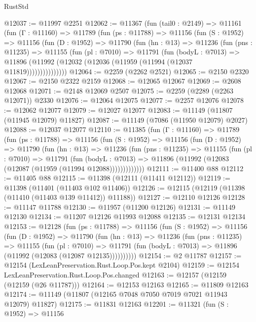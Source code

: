 \begin{lexlean}{RustStd}
\begin{coremodule}
@12037 := @11997 @2251
@12062 := @11367
    (fun (tail0 : @2149) =>
    @11161
      (fun (Γ : @11160) =>
      @11789
        (fun (ps : @11788) =>
        @11156
          (fun (S : @1952) =>
          @11156
            (fun (D : @1952) =>
            @11790
              (fun (hn : @13) =>
              @11236
                (fun (pns : @11235) =>
                @11155
                  (fun (pl : @7010) =>
                  @11791
                    (fun (bodyL : @7013) =>
                    @11896 (@11992 (@12032 (@12036 (@11959 (@11994 (@12037 @11819)))))))))))))))
@12064 := @2259 (@2262 @2521)
@12065 := @2150 @2320
@12067 := @2150 @2322 @2159
@12068 := @12065 @12067
@12069 := @2608 @12068
@12071 := @2148 @12069 @2507
@12075 := @2259 (@2289 (@2263 @12071)) @2330
@12076 := @12064 @12075
@12077 := @2257 @12076
@12078 := @12062 @12077
@12079 := @12027 @12077
@12083 := @11149 (@11807 (@11945 @12079) @11827)
@12087 := @11149 (@7086 (@11950 @12079) @2027)
@12088 := @12037 @12077
@12110 := @11385
    (fun (Γ : @11160) =>
    @11789
      (fun (ps : @11788) =>
      @11156
        (fun (S : @1952) =>
        @11156
          (fun (D : @1952) =>
          @11790
            (fun (hn : @13) =>
            @11236
              (fun (pns : @11235) =>
              @11155
                (fun (pl : @7010) =>
                @11791
                  (fun (bodyL : @7013) =>
                  @11896 (@11992 (@12083 (@12087 (@11959 (@11994 @12088)))))))))))))
@12111 := @11400 @88
@12112 := @11405 @88
@12115 := @11398 (@12111 (@11411 @12112))
@12119 := @11398 (@11401 (@11403 @102 @11406))
@12126 := @12115 (@12119 (@11398 (@11410 (@11403 @139 @11412)) @11188))
@12127 := @12110 @12126
@12128 := @11147 @11788
@12130 := @11957 (@11200 @12126)
@12131 := @11149 @12130
@12134 := @11207 @12126 @11993 @12088
@12135 := @12131 @12134
@12153 := @12128
    (fun (ps : @11788) =>
    @11156
      (fun (S : @1952) =>
      @11156
        (fun (D : @1952) =>
        @11790
          (fun (hn : @13) =>
          @11236
            (fun (pns : @11235) =>
            @11155
              (fun (pl : @7010) =>
              @11791 (fun (bodyL : @7013) => @11896 (@11992 (@12083 (@12087 @12135))))))))))
@12154 := @2 @11787
@12157 := @12154 (LexLeanPreservation.Rust.Loop.Pos.kept @2104)
@12159 := @12154 LexLeanPreservation.Rust.Loop.Pos.changed
@12163 := @12157 (@12159 (@12159 (@26 @11787)))
@12164 := @12153 @12163
@12165 := @11809 @12163
@12174 := @11149 (@11807 (@12165 @7048 @7050 @7019 @7021 @11943 @12079) @11827)
@12175 := @11831 @12163
@12201 := @11321
    (fun (S : @1952) =>
    @11156

\end{coremodule}
\end{lexlean}
